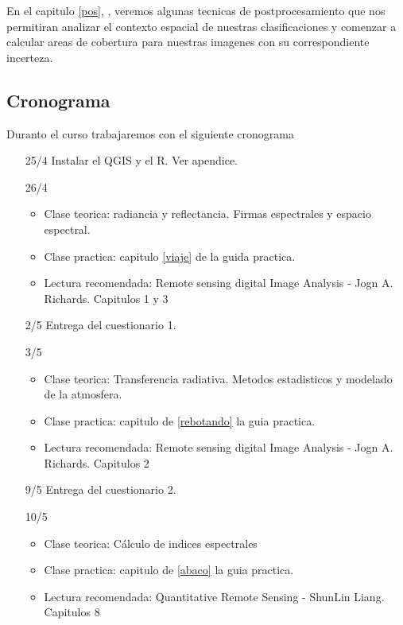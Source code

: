 \documentclass[a4paper]{book}
\begin{document}
En el capitulo \ref{pos}, , veremos algunas tecnicas de postprocesamiento
que nos permitiran analizar el contexto espacial de nuestras clasificaciones y
comenzar a calcular areas de cobertura para nuestras imagenes con su correspondiente incerteza.

\subsection{Cronograma}

Duranto el curso trabajaremos con el siguiente cronograma

\begin{itemize}
  \item[25/4] Instalar el QGIS y el R. Ver apendice.
  \item[26/4] 
  \begin{itemize}
    \item Clase teorica: radiancia y reflectancia. Firmas espectrales y espacio espectral.
    \item Clase practica: capitulo \ref{viaje} de la guida practica.
    \item Lectura recomendada: Remote sensing digital Image Analysis - Jogn A. Richards. Capitulos 1 y 3
  \end{itemize}
  \item[2/5] Entrega del cuestionario 1.
  \item[3/5] 
  \begin{itemize}
    \item Clase teorica: Transferencia radiativa. Metodos estadisticos y modelado de la atmosfera.
    \item Clase practica: capitulo de \ref{rebotando} la guia practica.
    \item Lectura recomendada: Remote sensing digital Image Analysis - Jogn A. Richards. Capitulos 2
  \end{itemize}
  \item[9/5] Entrega del cuestionario 2.
  \item[10/5] 
  \begin{itemize}
    \item Clase teorica: C\'alculo de indices espectrales
    \item Clase practica: capitulo de \ref{abaco} la guia practica.
    \item Lectura recomendada: Quantitative Remote Sensing - ShunLin Liang. Capitulos 8
  \end{itemize}

\end{itemize}
\end{document}
